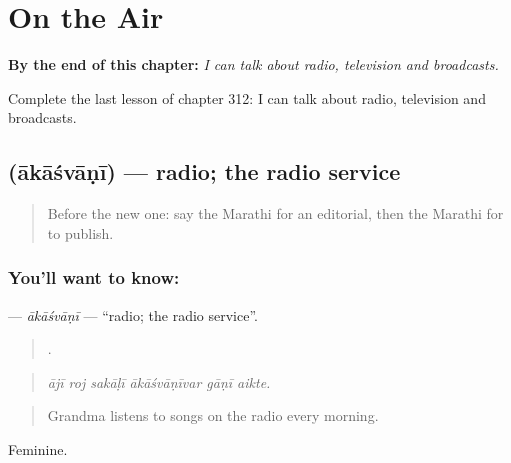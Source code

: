 
\chapter{On the Air}
\label{ch:mr-on-the-air}

\begin{chapteropening}
\textbf{By the end of this chapter:} \emph{I can talk about radio, television and broadcasts.}

Complete the last lesson of chapter 312: I can talk about radio, television and broadcasts.
\end{chapteropening}

\section[\texorpdfstring{\mr{आकाशवाणी} (ākāśvāṇī)}{आकाशवाणी (ākāśvāṇī)}]{ (ākāśvāṇī) — radio; the radio service}

\label{lesson:MR-C312-akasvani}



\begin{quote}
Before the new one: say the Marathi for an editorial, then the Marathi for to publish.
\end{quote}

\subsection*{You'll want to know: }
\textbf{} — \emph{ākāśvāṇī} — \textquotedblleft{}radio; the radio service\textquotedblright{}.

\begin{quote}
     .
\end{quote}

\begin{quote}
\emph{ājī roj sakāḷī ākāśvāṇīvar gāṇī aikte.}
\end{quote}

\begin{quote}
Grandma listens to songs on the radio every morning.
\end{quote}

Feminine.


